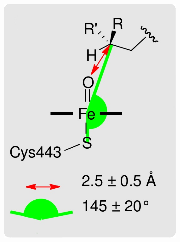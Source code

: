 \begin{figure}
\centering
\begin{subfigure}[b]{0.35\textwidth}
\centering
\includegraphics[width=\textwidth]{figures/idsite/33a}
\caption{}
\label{figure:first_sp3_constraints}
\end{subfigure}
\hspace{0.1\textwidth}
\begin{subfigure}[b]{0.35\textwidth}
\centering

\end{subfigure}
\end{figure}
